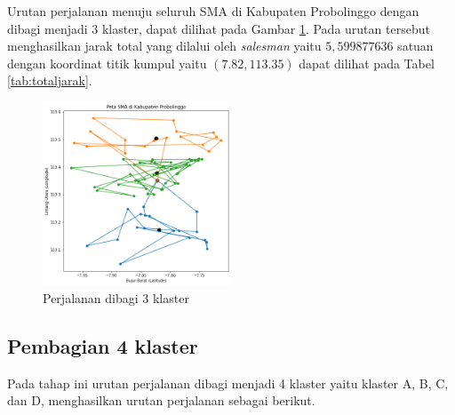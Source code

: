 Urutan perjalanan menuju seluruh SMA di Kabupaten Probolinggo dengan dibagi menjadi 3 klaster, dapat dilihat pada Gambar \ref{fig:hasil_mtsp3}. Pada urutan tersebut menghasilkan jarak total yang dilalui oleh \textit{salesman} yaitu $5,599877636$ satuan dengan koordinat titik kumpul yaitu $(7.82, 113.35)$ dapat dilihat pada Tabel \ref{tab:totaljarak}.

\begin{figure}[H]
\centering
\includegraphics[width=0.5\textwidth]{Gambar/hasil_mtsp/3}
\caption{Perjalanan dibagi 3 klaster}
\label{fig:hasil_mtsp3}
\end{figure}

\subsection{Pembagian 4 klaster}

Pada tahap ini urutan perjalanan dibagi menjadi 4 klaster yaitu klaster A, B, C, dan D, menghasilkan urutan perjalanan sebagai berikut.

